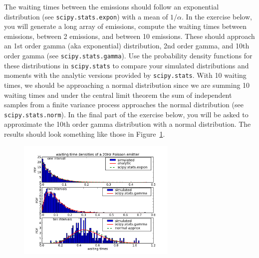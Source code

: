 The waiting times between the emissions should follow an exponential
distribution (see \texttt{scipy.stats.expon}) with a mean of
$1/\alpha$.  In the exercise below, you will generate a long array of
emissions, compute the waiting times between emissions, between 2
emissions, and between 10 emissions.  These should approach an 1st
order gamma (aka exponential) distribution, 2nd order gamma, and 10th
order gamma (see \texttt{scipy.stats.gamma}).  Use the probability
density functions for these distributions in \texttt{scipy.stats} to
compare your simulated distributions and moments with the analytic
versions provided by \texttt{scipy.stats}.  With 10 waiting times, we
should be approaching a normal distribution since we are summing 10
waiting times and under the central limit theorem the sum of
independent samples from a finite variance process approaches the
normal distribution (see \texttt{scipy.stats.norm}).  In the final
part of the exercise below, you will be asked to approximate the 10th
order gamma distribution with a normal distribution.  The results
should look something like those in
Figure~\ref{fig:stats_distributions}.



\begin{figure}
\begin{centering}\includegraphics[width=3in]{fig/stats_distributions}\par\end{centering}

\caption{\label{fig:stats_distributions}}
\end{figure}
